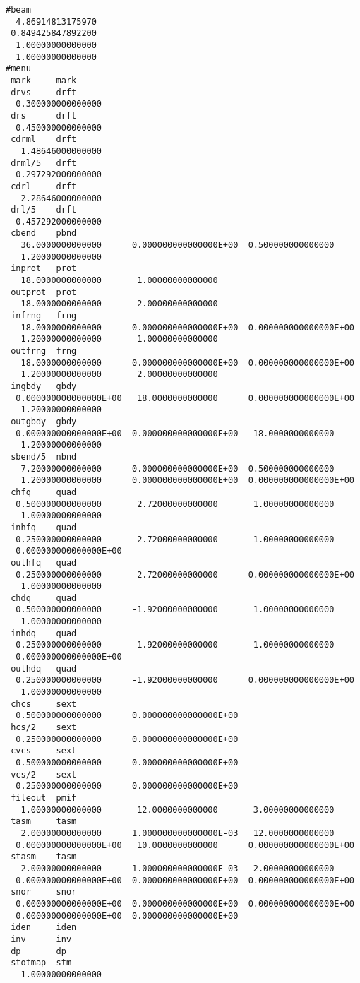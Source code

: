 \begin{footnotesize}
\begin{verbatim}
#beam
  4.86914813175970
 0.849425847892200
  1.00000000000000
  1.00000000000000
#menu
 mark     mark
 drvs     drft
  0.300000000000000
 drs      drft
  0.450000000000000
 cdrml    drft
   1.48646000000000
 drml/5   drft
  0.297292000000000
 cdrl     drft
   2.28646000000000
 drl/5    drft
  0.457292000000000
 cbend    pbnd
   36.0000000000000      0.000000000000000E+00  0.500000000000000
   1.20000000000000
 inprot   prot
   18.0000000000000       1.00000000000000
 outprot  prot
   18.0000000000000       2.00000000000000
 infrng   frng
   18.0000000000000      0.000000000000000E+00  0.000000000000000E+00
   1.20000000000000       1.00000000000000
 outfrng  frng
   18.0000000000000      0.000000000000000E+00  0.000000000000000E+00
   1.20000000000000       2.00000000000000
 ingbdy   gbdy
  0.000000000000000E+00   18.0000000000000      0.000000000000000E+00
   1.20000000000000
 outgbdy  gbdy
  0.000000000000000E+00  0.000000000000000E+00   18.0000000000000
   1.20000000000000
 sbend/5  nbnd
   7.20000000000000      0.000000000000000E+00  0.500000000000000
   1.20000000000000      0.000000000000000E+00  0.000000000000000E+00
 chfq     quad
  0.500000000000000       2.72000000000000       1.00000000000000
   1.00000000000000
 inhfq    quad
  0.250000000000000       2.72000000000000       1.00000000000000
  0.000000000000000E+00
 outhfq   quad
  0.250000000000000       2.72000000000000      0.000000000000000E+00
   1.00000000000000
 chdq     quad
  0.500000000000000      -1.92000000000000       1.00000000000000
   1.00000000000000
 inhdq    quad
  0.250000000000000      -1.92000000000000       1.00000000000000
  0.000000000000000E+00
 outhdq   quad
  0.250000000000000      -1.92000000000000      0.000000000000000E+00
   1.00000000000000
 chcs     sext
  0.500000000000000      0.000000000000000E+00
 hcs/2    sext
  0.250000000000000      0.000000000000000E+00
 cvcs     sext
  0.500000000000000      0.000000000000000E+00
 vcs/2    sext
  0.250000000000000      0.000000000000000E+00
 fileout  pmif
   1.00000000000000       12.0000000000000       3.00000000000000
 tasm     tasm
   2.00000000000000      1.000000000000000E-03   12.0000000000000
  0.000000000000000E+00   10.0000000000000      0.000000000000000E+00
 stasm    tasm
   2.00000000000000      1.000000000000000E-03   2.00000000000000
  0.000000000000000E+00  0.000000000000000E+00  0.000000000000000E+00
 snor     snor
  0.000000000000000E+00  0.000000000000000E+00  0.000000000000000E+00
  0.000000000000000E+00  0.000000000000000E+00
 iden     iden
 inv      inv
 dp       dp
 stotmap  stm
   1.00000000000000

\end{verbatim}
\end{footnotesize}
